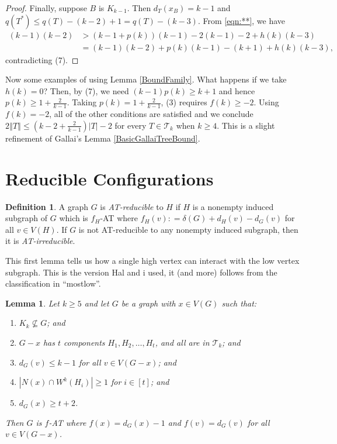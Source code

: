 \documentclass[12pt]{article}
\theoremstyle{plain}
\newtheorem{lem}[thm]{Lemma}
\theoremstyle{definition}
\newtheorem{defn}{Definition}
\theoremstyle{remark}
\newcommand{\fancy}[1]{\mathcal{#1}}
\newcommand{\T}{\fancy{T}}
\newcommand{\card}[1]{\left|#1\right|}
\newcommand{\size}[1]{\left\Vert#1\right\Vert}
\newcommand{\irange}[1]{\left[#1\right]}
\newcommand{\parens}[1]{\left( #1 \right)}
\newcommand{\DefinedAs}{\mathrel{\mathop:}=}
\begin{document}
\begin{proof}
 	Finally, suppose $B$ is $K_{k-1}$.  Then $d_T(x_B) = k - 1$ and $q(T^*) \le q(T) - (k-2) + 1 = q(T) - (k-3)$.  From \ref{eqn:**}, we have
 	\begin{align*}
	 	(k-1)(k-2) &> (k-1 + p(k))(k-1) - 2(k-1) - 2 + h(k)(k-3)\\
	 	&= (k-1)(k-2) + p(k)(k-1) - (k+1) + h(k)(k-3),
 	\end{align*}
 	contradicting (7).
\end{proof}

Now some examples of using Lemma \ref{BoundFamily}.  What happens if we take $h(k) = 0$?  Then, by (7), we need $(k-1)p(k) \ge k + 1$ and hence $p(k) \ge 1 + \frac{2}{k-1}$.  Taking $p(k) = 1 + \frac{2}{k-1}$, (3) requires $f(k) \ge -2$.  Using $f(k) = -2$, all of the other conditions are satisfied and we conclude $2\size{T} \le \parens{k-2 + \frac{2}{k-1}}\card{T} - 2$ for every $T \in \T_k$ when $k \ge 4$.  This is a slight refinement of Gallai's Lemma \ref{BasicGallaiTreeBound}.

\section{Reducible Configurations}
\begin{defn}
	A graph $G$ is \emph{AT-reducible} to $H$ if $H$ is a nonempty induced subgraph of $G$ which is $f_H$-AT where $f_H(v) \DefinedAs \delta(G) + d_H(v) - d_G(v)$ for all $v \in V(H)$.  
	If $G$ is not AT-reducible to any nonempty induced subgraph, then it is \emph{AT-irreducible}.
\end{defn}

This first lemma tells us how a single high vertex can interact with the low vertex subgraph.  This is the version Hal and i used, it (and more) follows from the classification in ``mostlow''.

\begin{lem}\label{ConfigurationTypeOneEuler}
Let $k \ge 5$ and let $G$ be a graph with $x \in V(G)$ such that:
\begin{enumerate}
\item $K_k \not \subseteq G$; and
\item $G-x$ has $t$ components $H_1, H_2, \ldots, H_t$, and all are in $\T_k$; and
\item $d_G(v) \leq k - 1$ for all $v \in V(G-x)$; and
\item $\card{N(x) \cap W^k(H_i)} \ge 1$ for $i \in \irange{t}$; and
\item $d_G(x) \ge t+2$.
\end{enumerate}

\noindent Then $G$ is $f$-AT where $f(x) = d_G(x) - 1$ and $f(v) = d_G(v)$ for all $v \in V(G - x)$.
\end{lem}
\end{document}

